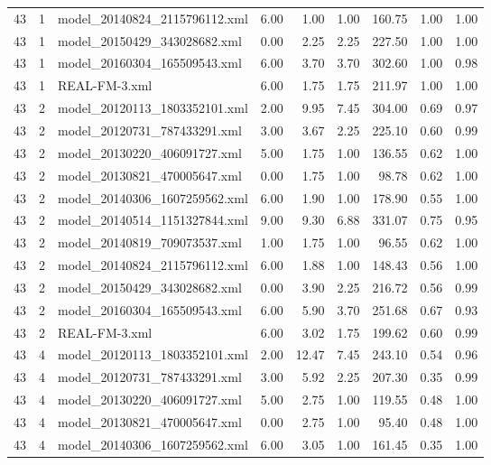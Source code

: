 \begin{table}[ht]
\begin{tabular}{rrlrrrrrr}
   43 &   1 & model\_20140824\_2115796112.xml & 6.00 & 1.00 & 1.00 & 160.75 & 1.00 & 1.00 \\ 
   43 &   1 & model\_20150429\_343028682.xml & 0.00 & 2.25 & 2.25 & 227.50 & 1.00 & 1.00 \\ 
   43 &   1 & model\_20160304\_165509543.xml & 6.00 & 3.70 & 3.70 & 302.60 & 1.00 & 0.98 \\ 
   43 &   1 & REAL-FM-3.xml & 6.00 & 1.75 & 1.75 & 211.97 & 1.00 & 1.00 \\ 
   43 &   2 & model\_20120113\_1803352101.xml & 2.00 & 9.95 & 7.45 & 304.00 & 0.69 & 0.97 \\ 
   43 &   2 & model\_20120731\_787433291.xml & 3.00 & 3.67 & 2.25 & 225.10 & 0.60 & 0.99 \\ 
   43 &   2 & model\_20130220\_406091727.xml & 5.00 & 1.75 & 1.00 & 136.55 & 0.62 & 1.00 \\ 
   43 &   2 & model\_20130821\_470005647.xml & 0.00 & 1.75 & 1.00 & 98.78 & 0.62 & 1.00 \\ 
   43 &   2 & model\_20140306\_1607259562.xml & 6.00 & 1.90 & 1.00 & 178.90 & 0.55 & 1.00 \\ 
   43 &   2 & model\_20140514\_1151327844.xml & 9.00 & 9.30 & 6.88 & 331.07 & 0.75 & 0.95 \\ 
   43 &   2 & model\_20140819\_709073537.xml & 1.00 & 1.75 & 1.00 & 96.55 & 0.62 & 1.00 \\ 
   43 &   2 & model\_20140824\_2115796112.xml & 6.00 & 1.88 & 1.00 & 148.43 & 0.56 & 1.00 \\ 
   43 &   2 & model\_20150429\_343028682.xml & 0.00 & 3.90 & 2.25 & 216.72 & 0.56 & 0.99 \\ 
   43 &   2 & model\_20160304\_165509543.xml & 6.00 & 5.90 & 3.70 & 251.68 & 0.67 & 0.93 \\ 
   43 &   2 & REAL-FM-3.xml & 6.00 & 3.02 & 1.75 & 199.62 & 0.60 & 0.99 \\ 
   43 &   4 & model\_20120113\_1803352101.xml & 2.00 & 12.47 & 7.45 & 243.10 & 0.54 & 0.96 \\ 
   43 &   4 & model\_20120731\_787433291.xml & 3.00 & 5.92 & 2.25 & 207.30 & 0.35 & 0.99 \\ 
   43 &   4 & model\_20130220\_406091727.xml & 5.00 & 2.75 & 1.00 & 119.55 & 0.48 & 1.00 \\ 
   43 &   4 & model\_20130821\_470005647.xml & 0.00 & 2.75 & 1.00 & 95.40 & 0.48 & 1.00 \\ 
   43 &   4 & model\_20140306\_1607259562.xml & 6.00 & 3.05 & 1.00 & 161.45 & 0.35 & 1.00 \\ 

\end{tabular}
\end{table}
